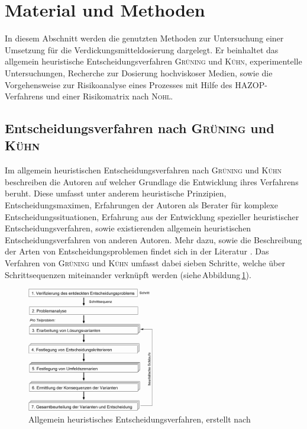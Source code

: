 \newpage
\section{Material und Methoden}
\label{sec:durchführung}

In diesem Abschnitt werden die genutzten Methoden zur Untersuchung einer Umsetzung für die Verdickungsmitteldosierung dargelegt. Er beinhaltet das allgemein heuristische Entscheidungsverfahren \textsc{Grüning} und \textsc{Kühn}, experimentelle Untersuchungen, Recherche zur Dosierung hochviskoser Medien, sowie die Vorgehensweise zur Risikoanalyse eines Prozesses mit Hilfe des HAZOP-Verfahrens und einer Risikomatrix nach \textsc{Nohl}.

\subsection{Entscheidungsverfahren nach \textsc{Grüning} und \textsc{Kühn}}
\label{sec:entscheidungsverfahren}
Im allgemein heuristischen Entscheidungsverfahren nach \textsc{Grüning} und \textsc{Kühn} beschreiben die Autoren auf welcher Grundlage die Entwicklung ihres Verfahrens beruht. Diese umfasst unter anderem heuristische Prinzipien, Entscheidungsmaximen, Erfahrungen der Autoren als Berater für komplexe Entscheidungssituationen, Erfahrung aus der Entwicklung spezieller heuristischer Entscheidungsverfahren, sowie existierenden allgemein heuristischen Entscheidungsverfahren von anderen Autoren. Mehr dazu, sowie die Beschreibung der Arten von Entscheidungsproblemen findet sich in der Literatur \cite{Grunig.2013}. Das Verfahren von \textsc{Grüning} und \textsc{Kühn} umfasst dabei sieben Schritte, welche über Schrittsequenzen miteinander verknüpft werden (siehe\,Abbildung\,\ref{fig:ahev}).  

\begin{figure}[h!]
	\centering
	\includegraphics[width=0.5\textwidth]{img/heuristik}
	\caption{Allgemein heuristisches Entscheidungsverfahren, erstellt nach \cite{Grunig.2013}}
	\label{fig:ahev}
\end{figure}
\FloatBarrier

